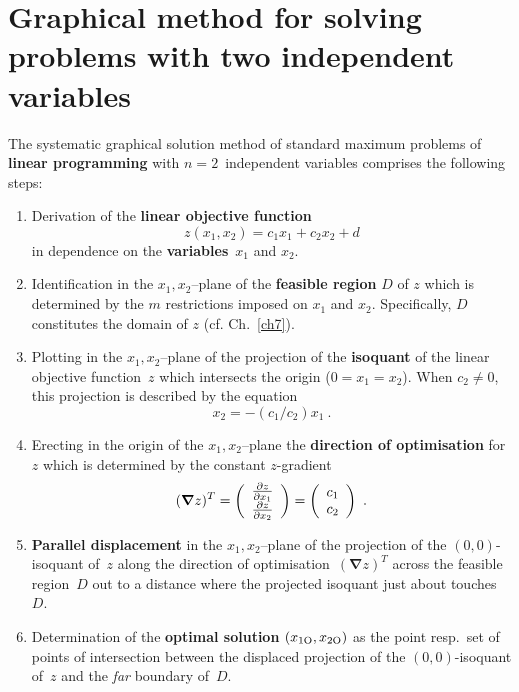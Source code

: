 \section[Graphical solution method]%
{Graphical method for solving problems with two independent 
variables}
The systematic graphical solution method of standard maximum 
problems of {\bf linear programming} with $n=2$~independent 
variables comprises the following steps:
%
\begin{enumerate}

\item Derivation of the {\bf linear objective function}
%
$$
z(x_{1},x_{2})=c_{1}x_{1}+c_{2}x_{2}+d
$$
%
in dependence on the {\bf variables}~$x_{1}$ and $x_{2}$.

\item Identification in the $x_{1},x_{2}$--plane of the {\bf feasible region} $D$ of $z$ which is determined by the $m$ restrictions imposed on $x_{1}$ and $x_{2}$. Specifically, $D$ constitutes the domain of $z$ (cf. Ch.~\ref{ch7}).

\item Plotting in the $x_{1},x_{2}$--plane of the projection of the {\bf isoquant} of the linear objective function~$z$ which intersects the origin ($0=x_{1}=x_{2}$). When $c_{2} \neq 0$, this projection is described by the equation
%
\[
x_{2} = -(c_{1}/c_{2})x_{1} \ .
\]
%

\item Erecting in the origin of the $x_{1},x_{2}$--plane the {\bf direction of optimisation} for $z$ which is determined by the constant $z$-gradient
%
$$
(\boldsymbol{\nabla} z)^{T}
=\left(\begin{array}{c}\frac{\ptl z}{\ptl x_{1}} \\
\frac{\ptl z}{\ptl x_{2}}\end{array}\right)
=\left(\begin{array}{c} c_{1} \\ c_{2}\end{array}\right) \ .
$$
%

\item {\bf Parallel displacement} in the $x_{1},x_{2}$--plane of the projection of the $(0,0)$-isoquant of~$z$ along the direction of optimisation~$(\boldsymbol{\nabla} z)^{T}$ across the feasible region~$D$ out to a distance where the projected isoquant just about touches~$D$.

\item Determination of the {\bf optimal solution} $(x_{1{\rm O}},
x_{2{\rm O}})$ as the point resp.~set of points of intersection between the displaced projection of the $(0,0)$-isoquant of~$z$ and the \emph{far} boundary of~$D$.


\end{enumerate}
